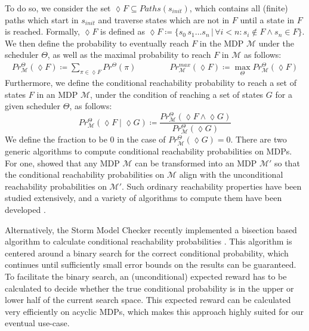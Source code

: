 To do so, we consider the set $\lozenge F \subseteq \mathit{Paths}(s_{init})$, which contains all (finite) paths which start in $s_{init}$ and traverse states which are not in $F$ until a state in $F$ is reached. 
Formally, $\lozenge F$ is defined as $\lozenge F \coloneqq \{ s_0\, s_1 \dots s_n \,|\, \forall i < n\colon s_i \notin F \land s_n \in F \}$.
We then define the probability to eventually reach $F$ in the MDP $\mathcal{M}$ under the scheduler $\Theta$, as well as the maximal probability to reach $F$ in $\mathcal{M}$ as follows:%
%
\begin{align*}
	Pr^\Theta_\mathcal{M}(\lozenge F) \coloneqq \sum_{\pi \in \lozenge F} Pr^\Theta(\pi) 
	\qquad \qquad 
	Pr^{\mathit{max}}_\mathcal{M}(\lozenge F) \coloneqq \max\limits_{\Theta} Pr^\Theta_\mathcal{M}(\lozenge F) 
\end{align*}
%
Furthermore, we define the conditional reachability probability to reach a set of states $F$ in an MDP $\mathcal{M}$, under the condition of reaching a set of states $G$ for a given scheduler $\Theta$, as follows:
%
$$ Pr^{\Theta}_\mathcal{M} (\lozenge F \;|\; \lozenge G) \coloneqq \frac{Pr^{\Theta}_\mathcal{M} (\lozenge F \land \lozenge G)}{Pr^{\Theta}_\mathcal{M} (\lozenge G)} 
$$
%
We define the fraction to be $0$ in the case of $Pr^{\Theta}_\mathcal{M} (\lozenge G) = 0$.
%
There are two generic algorithms to compute conditional reachability probabilities on MDPs.
For one, \citet{baier2014computing} showed that any MDP $\mathcal{M}$ can be transformed into an MDP $\mathcal{M}'$ so that the conditional reachability probabilities on $\mathcal{M}$ align with the unconditional reachability probabilities on $\mathcal{M}'$.
Such ordinary reachability properties have been studied extensively, and a variety of algorithms to compute them have been developed \cite{hartmanns2023practitioner}.

Alternatively, the Storm Model Checker recently implemented  a bisection based algorithm to calculate conditional reachability probabilities \citeBisection. 
This algorithm is centered around a binary search for the correct conditional probability, which continues until sufficiently small error bounds on the results can be guaranteed.
To facilitate the binary search, an (unconditional) expected reward has to be calculated to decide whether the true conditional probability is in the upper or lower half of the current search space.
This expected reward can be calculated very efficiently on acyclic MDPs, which makes this approach highly suited for our eventual use-case.

